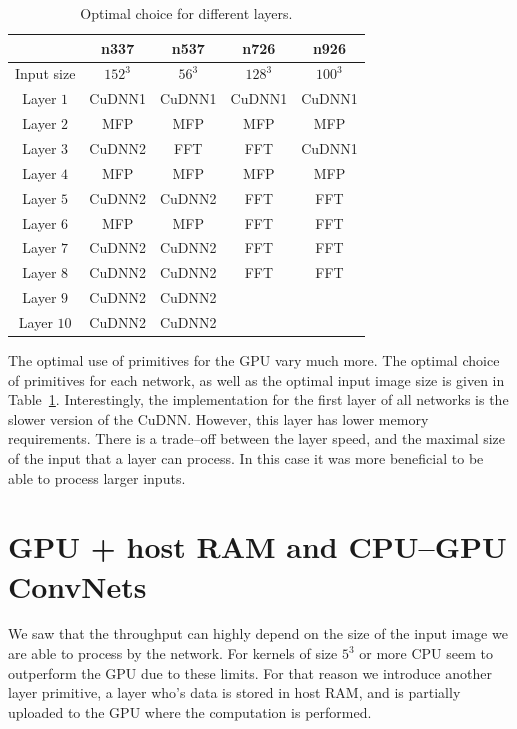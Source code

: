 \documentclass[conference]{IEEEtran}
\begin{document}
  \begin{table}
    \centering
    \begin{tabular}{ccccc}
      \toprule
      & n337    & n537  &  n726  &  n926 \\
      \midrule
      Input size & $152^3$ &  $56^3$  & $128^3$  & $100^3$ \\
      \midrule
      Layer $1$  &  CuDNN1  &  CuDNN1  & CuDNN1   & CuDNN1  \\
      Layer $2$  &  MFP     &  MFP     & MFP      & MFP     \\
      Layer $3$  &  CuDNN2  &  FFT     & FFT      & CuDNN1  \\
      Layer $4$  &  MFP     &  MFP     & MFP      & MFP     \\
      Layer $5$  &  CuDNN2  &  CuDNN2  & FFT      & FFT     \\
      Layer $6$  &  MFP     &  MFP     & FFT      & FFT     \\
      Layer $7$  &  CuDNN2  &  CuDNN2  & FFT      & FFT     \\
      Layer $8$  &  CuDNN2  &  CuDNN2  & FFT      & FFT     \\
      Layer $9$  &  CuDNN2  &  CuDNN2  & & \\
      Layer $10$ &  CuDNN2  &  CuDNN2  & & \\
      \bottomrule
    \end{tabular}
    \caption{Optimal choice for different layers.}
    \label{table:gpu_optimal}
  \end{table}



  The optimal use of primitives for the GPU vary much more.  The
  optimal choice of primitives for each network, as well as the
  optimal input image size is given in Table~\ref{table:gpu_optimal}.
  Interestingly, the implementation for the first layer of all
  networks is the slower version of the CuDNN.  However, this layer
  has lower memory requirements.  There is a trade--off between the
  layer speed, and the maximal size of the input that a layer can
  process.  In this case it was more beneficial to be able to process
  larger inputs.


\section{GPU + host RAM and CPU--GPU ConvNets}

  We saw that the throughput can highly depend on the size of the
  input image we are able to process by the network.  For kernels of
  size $5^3$ or more CPU seem to outperform the GPU due to these
  limits.  For that reason we introduce another layer primitive, a
  layer who's data is stored in host RAM, and is partially uploaded to
  the GPU where the computation is performed.
\end{document}
